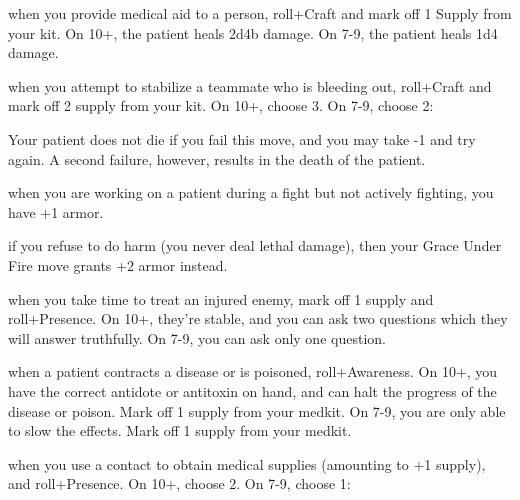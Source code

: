 \newpage

\begin{dossier}
\hspace{.5cm}%
\vrule width 2pt
\hspace{.3cm}%
\begin{dossiermovebar}
\fontsize{9pt}{1em}\selectfont
\setlength{\parskip}{.2cm}


 when you provide medical aid to a person, roll+Craft and mark off 1
Supply from your kit. On 10+, the patient heals 2d4b damage. On 7-9, the patient heals 1d4
damage.

 when you attempt to stabilize a teammate who is bleeding out, roll+Craft
and mark off 2 supply from your kit. On 10+, choose 3. On 7-9, choose 2:
\begin{moveoptions}



\end{moveoptions}
Your patient does not die if you fail this move, and you may take -1 and try again. A second
failure, however, results in the death of the patient.

 when you are working on a patient during a fight but not actively
fighting, you have +1 armor.

 if you refuse to do harm (you never deal lethal damage), then your
Grace Under Fire move grants +2 armor instead.

 when you take time to treat an injured enemy, mark off 1 supply
and roll+Presence. On 10+, they’re stable, and you can ask two questions which they will
answer truthfully. On 7-9, you can ask only one question.

 when a patient contracts a disease or is poisoned, roll+Awareness. On
10+, you have the correct antidote or antitoxin on hand, and can halt the progress of the
disease or poison. Mark off 1 supply from your medkit. On 7-9, you are only able to slow
the effects. Mark off 1 supply from your medkit.

 when you use a contact to obtain medical supplies (amounting to
+1 supply), and roll+Presence. On 10+, choose 2. On 7-9, choose 1:
\begin{moveoptions}


\end{moveoptions}
\end{dossiermovebar}
\end{dossier}
